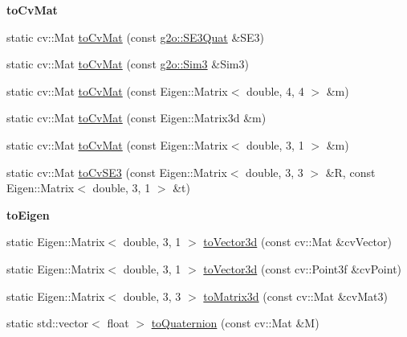 \begin{Indent}\textbf{ to\+Cv\+Mat}\par
\begin{DoxyCompactItemize}
\item 
static cv\+::\+Mat \mbox{\hyperlink{class_o_r_b___s_l_a_m2_1_1_converter_ac9d5a9ea7de26d34047aa0afddaa2091}{to\+Cv\+Mat}} (const \mbox{\hyperlink{classg2o_1_1_s_e3_quat}{g2o\+::\+S\+E3\+Quat}} \&S\+E3)
\item 
static cv\+::\+Mat \mbox{\hyperlink{class_o_r_b___s_l_a_m2_1_1_converter_a4bc1702afbd33a5d90d39f1940157e08}{to\+Cv\+Mat}} (const \mbox{\hyperlink{structg2o_1_1_sim3}{g2o\+::\+Sim3}} \&Sim3)
\item 
static cv\+::\+Mat \mbox{\hyperlink{class_o_r_b___s_l_a_m2_1_1_converter_a93055164116a8f35ecc5a9a5dcad1ca0}{to\+Cv\+Mat}} (const Eigen\+::\+Matrix$<$ double, 4, 4 $>$ \&m)
\item 
static cv\+::\+Mat \mbox{\hyperlink{class_o_r_b___s_l_a_m2_1_1_converter_a7558c9fde7b818582bee8b4a4ff00793}{to\+Cv\+Mat}} (const Eigen\+::\+Matrix3d \&m)
\item 
static cv\+::\+Mat \mbox{\hyperlink{class_o_r_b___s_l_a_m2_1_1_converter_a6748f1ecb782efc7741c1d2f6fbbed22}{to\+Cv\+Mat}} (const Eigen\+::\+Matrix$<$ double, 3, 1 $>$ \&m)
\item 
static cv\+::\+Mat \mbox{\hyperlink{class_o_r_b___s_l_a_m2_1_1_converter_a0972ca8f56ea15c1814f51be3804978f}{to\+Cv\+S\+E3}} (const Eigen\+::\+Matrix$<$ double, 3, 3 $>$ \&R, const Eigen\+::\+Matrix$<$ double, 3, 1 $>$ \&t)
\end{DoxyCompactItemize}
\end{Indent}
\begin{Indent}\textbf{ to\+Eigen}\par
\begin{DoxyCompactItemize}
\item 
static Eigen\+::\+Matrix$<$ double, 3, 1 $>$ \mbox{\hyperlink{class_o_r_b___s_l_a_m2_1_1_converter_a65fccab585e29d1acbf4c23e5ce69bdc}{to\+Vector3d}} (const cv\+::\+Mat \&cv\+Vector)
\item 
static Eigen\+::\+Matrix$<$ double, 3, 1 $>$ \mbox{\hyperlink{class_o_r_b___s_l_a_m2_1_1_converter_af7b71b64b74fd45b39b9a7f47ee80145}{to\+Vector3d}} (const cv\+::\+Point3f \&cv\+Point)
\item 
static Eigen\+::\+Matrix$<$ double, 3, 3 $>$ \mbox{\hyperlink{class_o_r_b___s_l_a_m2_1_1_converter_a000a7971e46afdc95d6692a70006182b}{to\+Matrix3d}} (const cv\+::\+Mat \&cv\+Mat3)
\item 
static std\+::vector$<$ float $>$ \mbox{\hyperlink{class_o_r_b___s_l_a_m2_1_1_converter_a16b54bd921d9cdc83d289cfd1598fb3c}{to\+Quaternion}} (const cv\+::\+Mat \&M)
\end{DoxyCompactItemize}
\end{Indent}


